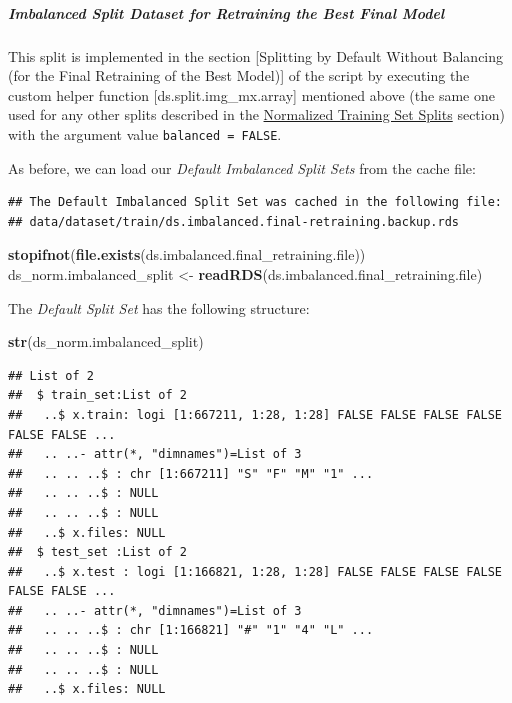 \documentclass[
]{report}
\newenvironment{Shaded}{\begin{snugshade}}{\end{snugshade}}
\newcommand{\FunctionTok}[1]{\textcolor[rgb]{0.13,0.29,0.53}{\textbf{#1}}}
\newcommand{\NormalTok}[1]{#1}
\newcommand{\OtherTok}[1]{\textcolor[rgb]{0.56,0.35,0.01}{#1}}
\begin{document}
\normalsize

\newpage

\subparagraph{\texorpdfstring{Imbalanced Split Dataset for Retraining the \emph{Best Final Model}}{Imbalanced Split Dataset for Retraining the Best Final Model}}\label{imbalanced-split-dataset-for-retraining-the-best-final-model}

\hfill\break

This split is implemented in the section {[}Splitting by Default Without Balancing (for the Final Retraining of the Best Model){]} of the script by executing the custom helper function {[}ds.split.img\_mx.array{]} mentioned above (the same one used for any other splits described in the \hyperref[normalized-training-set-splits]{Normalized Training Set Splits} section) with the argument value \texttt{balanced\ =\ FALSE}.

As before, we can load our \emph{Default Imbalanced Split Sets} from the cache file:

\begin{verbatim}
## The Default Imbalanced Split Set was cached in the following file:
## data/dataset/train/ds.imbalanced.final-retraining.backup.rds
\end{verbatim}

\begin{Shaded}
\begin{Highlighting}[]
\FunctionTok{stopifnot}\NormalTok{(}\FunctionTok{file.exists}\NormalTok{(ds.imbalanced.final\_retraining.file))}
\NormalTok{ds\_norm.imbalanced\_split }\OtherTok{\textless{}{-}} \FunctionTok{readRDS}\NormalTok{(ds.imbalanced.final\_retraining.file)}
\end{Highlighting}
\end{Shaded}

The \emph{Default Split Set} has the following structure:

\begin{Shaded}
\begin{Highlighting}[]
\FunctionTok{str}\NormalTok{(ds\_norm.imbalanced\_split)}
\end{Highlighting}
\end{Shaded}

\begin{verbatim}
## List of 2
##  $ train_set:List of 2
##   ..$ x.train: logi [1:667211, 1:28, 1:28] FALSE FALSE FALSE FALSE FALSE FALSE ...
##   .. ..- attr(*, "dimnames")=List of 3
##   .. .. ..$ : chr [1:667211] "S" "F" "M" "1" ...
##   .. .. ..$ : NULL
##   .. .. ..$ : NULL
##   ..$ x.files: NULL
##  $ test_set :List of 2
##   ..$ x.test : logi [1:166821, 1:28, 1:28] FALSE FALSE FALSE FALSE FALSE FALSE ...
##   .. ..- attr(*, "dimnames")=List of 3
##   .. .. ..$ : chr [1:166821] "#" "1" "4" "L" ...
##   .. .. ..$ : NULL
##   .. .. ..$ : NULL
##   ..$ x.files: NULL
\end{verbatim}
\end{document}
